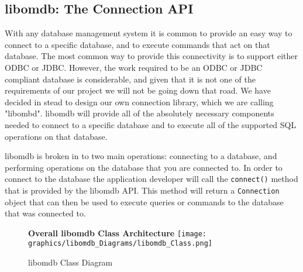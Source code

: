 \documentclass[letterpaper, 12pt]{article}
\renewcommand{\includegraphics}[2][]{\fbox{}}
\begin{document}
  \subsection{libomdb: The Connection API}
  With any database management system it is common to provide an easy way to connect
  to a specific database, and to execute commands that act on that database. The most common
  way to provide this connectivity is to support either ODBC or JDBC. However, the work 
  required to be an ODBC or JDBC compliant database is considerable, and given that it is
  not one of the requirements of our project we will not be going down that road. We have
  decided in stead to design our own connection library, which we are calling 
  "libombd". libomdb will provide all of the absolutely necessary components needed to 
  connect to a specific database and to execute all of the supported SQL operations on
  that database. 
  \par\vspace{\baselineskip}
  libomdb is broken in to two main operations: connecting to a database, and performing
  operations on the database that you are connected to. In order to connect to the database
  the application developer will call the 
  \lstinline[basicstyle=\ttfamily]|connect()| method that is provided by the libomdb API. 
  This method will return a \lstinline[basicstyle=\ttfamily]|Connection| object that can
  then be used to execute queries or commands to the database that was connected to. 
  \par\vspace{\baselineskip}
  
  \begin{figure}
    \centering
    \textbf{Overall libomdb Class Architecture}
    \texttt{[image: graphics/libomdb\_Diagrams/libomdb\_Class.png]}
    \caption{libomdb Class Diagram}
  \end{figure}
  
\end{document}
